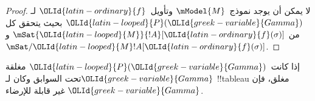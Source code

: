 \documentclass[../../../include/open-logic-section]{subfiles}
\begin{document}
\begin{proof}
  لا يمكن أن يوجد نموذج~$\mModel{M}$ وتأويل~${\OLId{latin-ordinary}{f}}$ لـ${\OLId{latin-looped}{P}}({\OLId{greek-variable}{Gamma}})$ بحيث
  يتحقق كل من $\mSat{{\OLId{latin-looped}{M}}}{!A}[{\OLId{latin-ordinary}{f}}(\sigma)]$ و
  $\mSat/{{\OLId{latin-looped}{M}}}{!A}[{\OLId{latin-ordinary}{f}}(\sigma)]$.
\end{proof}

\begin{thm}[السلامة]
  إذا كانت~${\OLId{latin-looped}{P}}({\OLId{greek-variable}{Gamma}})$ مغلقة تحت السوابق وكان لـ${\OLId{greek-variable}{Gamma}}$ !!{tableau}
  مغلق، فإن ${\OLId{greek-variable}{Gamma}}$ غير قابلة للإرضاء.
\end{thm}
\end{document}
